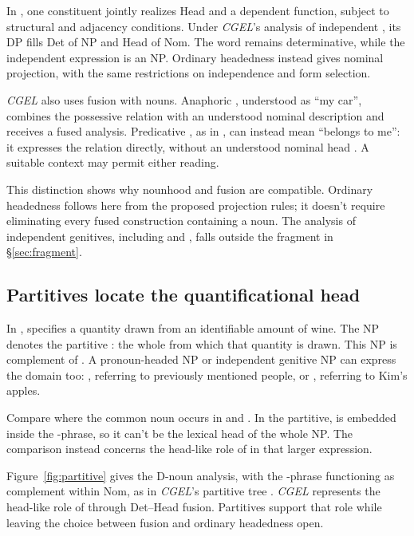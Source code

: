 \documentclass[12pt]{article}
\begin{document}
In \textcite{Payne2007}, one constituent jointly realizes Head and a dependent function, subject to structural and adjacency conditions. Under \textit{CGEL}'s analysis of independent , its DP fills Det of NP and Head of Nom. The word remains determinative, while the independent expression is an NP. Ordinary headedness instead gives  nominal projection, with the same restrictions on independence and form selection.

\textit{CGEL} also uses fusion with nouns. Anaphoric , understood as \enquote{my car}, combines the possessive relation with an understood nominal description and receives a fused analysis. Predicative , as in , can instead mean \enquote{belongs to me}: it expresses the relation directly, without an understood nominal head \citep[410--411, 470--471]{huddleston2002}. A suitable context may permit either reading.

This distinction shows why nounhood and fusion are compatible. Ordinary headedness follows here from the proposed projection rules; it doesn't require eliminating every fused construction containing a noun. The analysis of independent genitives, including  and , falls outside the fragment in §\ref{sec:fragment}.

\subsection{Partitives locate the quantificational head}

In ,  specifies a quantity drawn from an identifiable amount of wine. The NP  denotes the partitive : the whole from which that quantity is drawn. This NP is complement of . A pronoun-headed NP or independent genitive NP can express the domain too: , referring to previously mentioned people, or , referring to Kim's apples.

Compare where the common noun occurs in  and . In the partitive,  is embedded inside the -phrase, so it can't be the lexical head of the whole NP. The comparison instead concerns the head-like role of  in that larger expression.

Figure~\ref{fig:partitive} gives the D-noun analysis, with the -phrase functioning as complement within Nom, as in \textit{CGEL}'s partitive tree \citep[411--412]{huddleston2002}. \textit{CGEL} represents the head-like role of  through Det--Head fusion. Partitives support that role while leaving the choice between fusion and ordinary headedness open.
\end{document}
